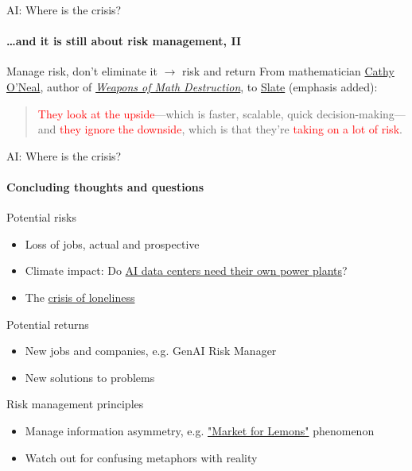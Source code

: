 \begin{frame}{AI: Where is the crisis?}
  \framesubtitle{\ldots and it is still about risk management, II}
  {\large Manage risk, don't eliminate it $\rightarrow$ risk and return}
  \newline
  \newline
  From mathematician \href{https://mathbabe.org/}{Cathy O'Neal}, author of \href{https://en.wikipedia.org/wiki/Weapons_of_Math_Destruction}{\textit{Weapons of Math Destruction}}, to \href{https://slate.com/business/2019/11/apple-card-credit-algorithm-bias-discrimination-women.html}{Slate} (emphasis added):
  \begin{quotation}
    \noindent \textcolor{red}{They look at the upside}—which is faster, scalable, quick decision-making—and \textcolor{red}{they ignore the downside}, which is that they're \textcolor{red}{taking on a lot of risk}.
  \end{quotation}

\end{frame}

\begin{frame}{AI: Where is the crisis?}
  \framesubtitle{Concluding thoughts and questions}
  {\large Potential risks}
  \begin{itemize}
    \item Loss of jobs, actual and prospective
    \item Climate impact: Do \href{https://english.elpais.com/technology/2024-04-30/why-data-centers-want-to-have-their-own-nuclear-reactors.html}{AI data centers need their own power plants}?
    \item The \href{https://www.hhs.gov/about/news/2023/05/03/new-surgeon-general-advisory-raises-alarm-about-devastating-impact-epidemic-loneliness-isolation-united-states.html}{crisis of loneliness}
  \end{itemize}

  {\large Potential returns}
  \begin{itemize}
    \item New jobs and companies, e.g. GenAI Risk Manager
    \item New solutions to problems
  \end{itemize}

  {\large Risk management principles}
  \begin{itemize}
    \item Manage information asymmetry, e.g. \href{https://en.wikipedia.org/wiki/The_Market\_for\_Lemons}{"Market for Lemons"} phenomenon
    \item Watch out for confusing metaphors with reality
  \end{itemize}

\end{frame}


